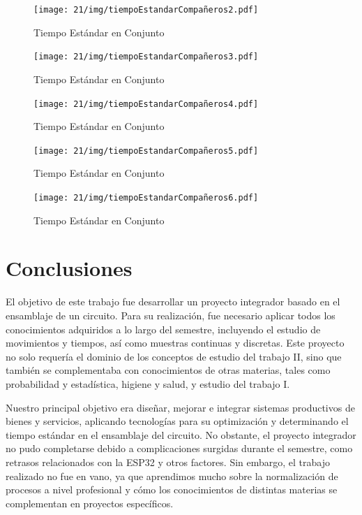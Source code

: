     \begin{figure}[H]
        \centering
        \texttt{[image: 21/img/tiempoEstandarCompañeros2.pdf]}
        \caption{Tiempo Estándar en Conjunto}
        \label{fig:tiempoEstandarCompañeros2}
    \end{figure}
    \begin{figure}[H]
        \centering
        \texttt{[image: 21/img/tiempoEstandarCompañeros3.pdf]}
        \caption{Tiempo Estándar en Conjunto}
        \label{fig:tiempoEstandarCompañeros3}
    \end{figure}
    \begin{figure}[H]
        \centering
        \texttt{[image: 21/img/tiempoEstandarCompañeros4.pdf]}
        \caption{Tiempo Estándar en Conjunto}
        \label{fig:tiempoEstandarCompañeros4}
    \end{figure}
    \begin{figure}[H]
        \centering
        \texttt{[image: 21/img/tiempoEstandarCompañeros5.pdf]}
        \caption{Tiempo Estándar en Conjunto}
        \label{fig:tiempoEstandarCompañeros5}
    \end{figure}
    
    \begin{figure}[H]
        \centering
        \texttt{[image: 21/img/tiempoEstandarCompañeros6.pdf]}
        \caption{Tiempo Estándar en Conjunto}
        \label{fig:tiempoEstandarCompañeros6}
    \end{figure}
    
    
    
    \section{Conclusiones}
    
    El objetivo de este trabajo fue desarrollar un proyecto integrador basado en el ensamblaje de un circuito. Para su realización, fue necesario aplicar todos los conocimientos adquiridos a lo largo del semestre, incluyendo el estudio de movimientos y tiempos, así como muestras continuas y discretas. Este proyecto no solo requería el dominio de los conceptos de estudio del trabajo II, sino que también se complementaba con conocimientos de otras materias, tales como probabilidad y estadística, higiene y salud, y estudio del trabajo I.
    
    Nuestro principal objetivo era diseñar, mejorar e integrar sistemas productivos de bienes y servicios, aplicando tecnologías para su optimización y determinando el tiempo estándar en el ensamblaje del circuito. No obstante, el proyecto integrador no pudo completarse debido a complicaciones surgidas durante el semestre, como retrasos relacionados con la ESP32 y otros factores. Sin embargo, el trabajo realizado no fue en vano, ya que aprendimos mucho sobre la normalización de procesos a nivel profesional y cómo los conocimientos de distintas materias se complementan en proyectos específicos.
    
